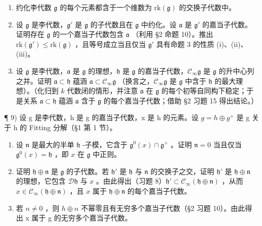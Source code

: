\begin{enumerate}
\def\labelenumi{\arabic{enumi})}
\setcounter{enumi}{5}
\item
  约化李代数 \(\mathfrak{g}\) 的每个元素都含于一个维数为 \(\mathrm{rk}(\mathfrak{g})\) 的交换子代数中。
\item
  设 \(\mathfrak{g}\) 是李代数，\(\mathfrak{g}'\) 是 \(\mathfrak{g}\) 的子代数且在 \(\mathfrak{g}\) 中约化。设 \(\mathfrak{a}\) 是 \(\mathfrak{g}'\) 的嘉当子代数。证明存在 \(\mathfrak{g}\) 的一个嘉当子代数包含 \(\mathfrak{a}\) （利用 §2 命题 10）。推出 \(\mathrm{rk}(\mathfrak{g}') \leq \mathrm{rk}(\mathfrak{g})\) ，且等号成立当且仅当 \(\mathfrak{g}'\) 具有命题 3 的性质 (i)、(ii)、(iii)。
\item
  设 \(\mathfrak{g}\) 是李代数，\(\mathfrak{a}\) 是 \(\mathfrak{g}\) 的理想，\(\mathfrak{h}\) 是 \(\mathfrak{g}\) 的嘉当子代数，\(\mathcal{C}_{\infty}\mathfrak{g}\) 是 \(\mathfrak{g}\) 的升中心列之并。证明 \(\mathfrak{a} \subset \mathfrak{h}\) 蕴涵 \(\mathfrak{a} \subset \mathcal{C}_{\infty}\mathfrak{g}\) （换言之，\(\mathcal{C}_{\infty}\mathfrak{g}\) 是 \(\mathfrak{g}\) 中含于 \(\mathfrak{h}\) 的最大理想）。（化归到 \(k\) 代数闭的情形，并注意 \(\mathfrak{a}\) 在 \(\mathfrak{g}\) 的每个初等自同构下稳定；于是关系 \(\mathfrak{a} \subset \mathfrak{h}\) 蕴涵 \(\mathfrak{a}\) 含于 \(\mathfrak{g}\) 的每个嘉当子代数；借助 §2 习题 15 得出结论。）
\end{enumerate}

¶ 9) 设 g 是李代数，h 是 g 的嘉当子代数，x 是 h 的元素。设 \(g = h \oplus g^{+}\) 是 g 关于 h 的 Fitting 分解（§1 第 1 节）。

\begin{enumerate}
\def\labelenumi{\alph{enumi})}
\item
  设 \(\mathfrak{n}\) 是最大的半单 \(\mathfrak{h}\) -子模，它含于 \(\mathfrak{g}^0 (x)\cap \mathfrak{g}^+\) 。证明 \(\mathfrak{n} = 0\) 当且仅当 \(\mathfrak{g}^0 (x) = \mathfrak{h}\) ，即 \(x\) 在 \(\mathfrak{g}\) 中正则。
\item
  证明 \(\mathfrak{h} \oplus \mathfrak{n}\) 是 \(\mathfrak{g}\) 的子代数。若 \(\mathfrak{h}'\) 是 \(\mathfrak{h}\) 与 \(\mathfrak{n}\) 的交换子之交，证明 \(\mathfrak{h}'\) 是 \(\mathfrak{h} \oplus \mathfrak{n}\) 的理想，它包含 \(\mathcal{D}\mathfrak{h}\) 与 \(x\) 。由此得出（习题 8）\(\mathfrak{h}' \subset \mathcal{C}_{\infty}(\mathfrak{h} \oplus \mathfrak{n})\) ，从而 \(x \in \mathcal{C}_{\infty}(\mathfrak{h} \oplus \mathfrak{n})\) ，且 \(x\) 属于 \(\mathfrak{h} \oplus \mathfrak{n}\) 的每个嘉当子代数。
\item
  若 \(n \neq 0\) ，则 \(h \oplus n\) 不幂零且有无穷多个嘉当子代数（§2 习题 10）。由此得出 x 属于 g 的无穷多个嘉当子代数。
\end{enumerate}

